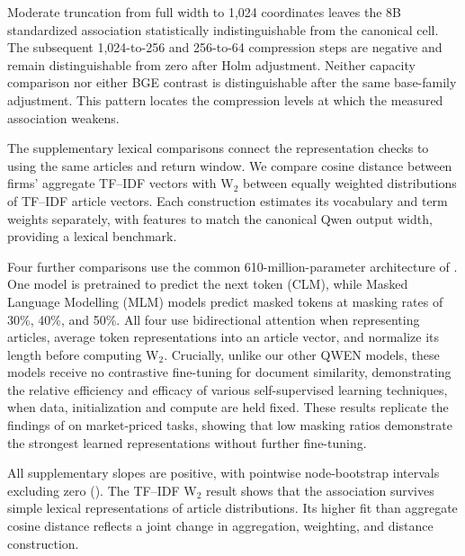 

Moderate truncation from full width to 1,024 coordinates leaves the 8B
standardized association statistically indistinguishable from the canonical
cell. The subsequent 1,024-to-256 and 256-to-64 compression steps are negative
and remain distinguishable from zero after Holm adjustment. Neither capacity
comparison nor either BGE contrast is distinguishable after the same
base-family adjustment. This pattern locates the compression levels at which
the measured
association weakens.

The supplementary lexical comparisons connect the representation checks to
\citet{box2018qualitative} using the same articles and return window.
We compare cosine distance between firms' aggregate TF--IDF vectors with
W$_2$ between equally weighted distributions of TF--IDF article vectors.
Each construction estimates its vocabulary and term weights separately,
with  features to match the canonical
Qwen output width, providing a lexical benchmark.

Four further comparisons use the common 610-million-parameter architecture
of \citet{gisserot2026should}.
One model is pretrained to predict the next token (CLM), while Masked
Language Modelling (MLM) models predict
masked tokens at masking rates of 30\%, 40\%, and 50\%.
All four use bidirectional attention when representing articles, average
token representations into an article vector, and normalize its length
before computing W$_2$.
Crucially, unlike our other QWEN models, these models receive no contrastive
fine-tuning for document similarity, demonstrating the relative efficiency
and efficacy of various self-supervised learning techniques, when data,
initialization and compute are held fixed. These results replicate the
findings of \citet{gisserot2026should} on market-priced tasks, showing that
low masking ratios demonstrate the strongest learned representations without
further fine-tuning.



All supplementary slopes are positive, with pointwise node-bootstrap
intervals excluding zero ().
The TF--IDF W$_2$ result shows that the association survives simple lexical
representations of article distributions.
Its higher fit than aggregate cosine distance reflects a joint change in
aggregation, weighting, and distance construction.

